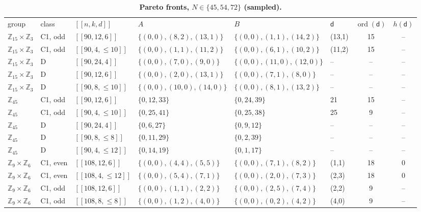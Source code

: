 \documentclass[reprint,twocolumn,superscriptaddress,nofootinbib]{revtex4-2}
\theoremstyle{plain}
\newcommand{\col}{\mathsf{d}}          %
\begin{document}
\begin{table}[!t]
\caption{\textbf{Pareto fronts, $N\in\{45,54,72\}$ (sampled).}}
\label{tab:codes-c}
\footnotesize
\begin{ruledtabular}
\begin{tabular}{llllllcc}
group & class & $[[n,k,d]]$ & $A$ & $B$ & $\col$ & $\operatorname{ord}(\col)$ & $h(\col)$ \\
\colrule
$\mathbb{Z}_{15}\times\mathbb{Z}_{3}$ & C1, odd & $[[90,12,6]]$ & $\{(0,0),(8,2),(13,1)\}$ & $\{(0,0),(1,1),(14,2)\}$ & (13,1) & 15 & -- \\
$\mathbb{Z}_{15}\times\mathbb{Z}_{3}$ & C1, odd & $[[90,4,\le10]]$ & $\{(0,0),(1,1),(11,2)\}$ & $\{(0,0),(6,1),(10,2)\}$ & (11,2) & 15 & -- \\
$\mathbb{Z}_{15}\times\mathbb{Z}_{3}$ & D & $[[90,24,4]]$ & $\{(0,0),(7,0),(9,0)\}$ & $\{(0,0),(11,0),(12,0)\}$ & -- & -- & -- \\
$\mathbb{Z}_{15}\times\mathbb{Z}_{3}$ & D & $[[90,12,6]]$ & $\{(0,0),(2,0),(13,1)\}$ & $\{(0,0),(7,1),(8,0)\}$ & -- & -- & -- \\
$\mathbb{Z}_{15}\times\mathbb{Z}_{3}$ & D & $[[90,8,\le10]]$ & $\{(0,0),(10,0),(14,0)\}$ & $\{(0,0),(8,1),(13,2)\}$ & -- & -- & -- \\
$\mathbb{Z}_{45}$ & C1, odd & $[[90,12,6]]$ & $\{0,12,33\}$ & $\{0,24,39\}$ & 21 & 15 & -- \\
$\mathbb{Z}_{45}$ & C1, odd & $[[90,4,\le10]]$ & $\{0,25,41\}$ & $\{0,25,38\}$ & 25 & 9 & -- \\
$\mathbb{Z}_{45}$ & D & $[[90,24,4]]$ & $\{0,6,27\}$ & $\{0,9,12\}$ & -- & -- & -- \\
$\mathbb{Z}_{45}$ & D & $[[90,8,\le8]]$ & $\{0,11,29\}$ & $\{0,2,39\}$ & -- & -- & -- \\
$\mathbb{Z}_{45}$ & D & $[[90,4,\le12]]$ & $\{0,14,19\}$ & $\{0,1,17\}$ & -- & -- & -- \\
$\mathbb{Z}_{9}\times\mathbb{Z}_{6}$ & C1, even & $[[108,12,6]]$ & $\{(0,0),(4,4),(5,5)\}$ & $\{(0,0),(7,1),(8,2)\}$ & (1,1) & 18 & 0 \\
$\mathbb{Z}_{9}\times\mathbb{Z}_{6}$ & C1, even & $[[108,4,\le12]]$ & $\{(0,0),(5,4),(7,1)\}$ & $\{(0,0),(2,0),(7,3)\}$ & (2,3) & 18 & 0 \\
$\mathbb{Z}_{9}\times\mathbb{Z}_{6}$ & C1, odd & $[[108,12,6]]$ & $\{(0,0),(1,1),(2,2)\}$ & $\{(0,0),(2,5),(7,4)\}$ & (2,2) & 9 & -- \\
$\mathbb{Z}_{9}\times\mathbb{Z}_{6}$ & C1, odd & $[[108,8,\le8]]$ & $\{(0,0),(1,2),(4,0)\}$ & $\{(0,0),(0,2),(4,2)\}$ & (4,0) & 9 & -- \\

\end{tabular}
\end{ruledtabular}
\end{table}
\end{document}
